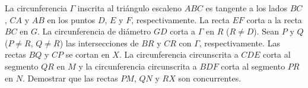 La circunferencia $\Gamma$ inscrita al triángulo escaleno $ABC$ es tangente a los lados $BC$, $CA$ y $AB$ en los puntos $D$, $E$ y $F$, respectivamente. La recta $EF$ corta a la recta $BC$ en $G$. La circunferencia de diámetro $GD$ corta a $\Gamma$ en $R$ ($R \neq D$). Sean $P$ y $Q$ ($P \neq R$, $Q \neq R$) las intersecciones de $BR$ y $CR$ con $\Gamma$, respectivamente. Las rectas $BQ$ y $CP$ se cortan en $X$. La circunferencia circunscrita a $CDE$ corta al segmento $QR$ en $M$ y la circunferencia circunscrita a $BDF$ corta al segmento $PR$ en $N$. Demostrar que las rectas $PM$, $QN$ y $RX$ son concurrentes.
